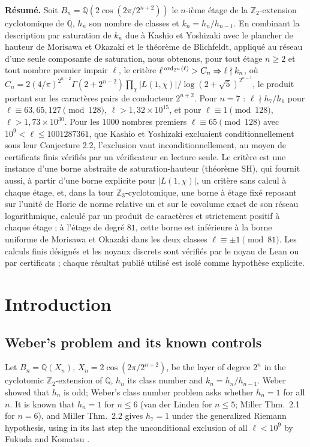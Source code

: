\documentclass[11pt]{amsart}
\theoremstyle{remark}\newtheorem{remark}[theorem]{Remark}
\theoremstyle{definition}\newtheorem{definition}[theorem]{Definition}
\newcommand{\Q}{\mathbb{Q}}\newcommand{\Z}{\mathbb{Z}}\newcommand{\R}{\mathbb{R}}\newcommand{\F}{\mathbb{F}}
\begin{document}
{\small\noindent\textbf{R\'esum\'e.} Soit $B_n=\Q(2\cos(2\pi/2^{n+2}))$ le $n$-i\`eme \'etage de la $\Z_2$-extension cyclotomique de $\Q$, $h_n$ son nombre de classes et $k_n=h_n/h_{n-1}$. En combinant la description par saturation de $k_n$ due \`a Kashio et Yoshizaki avec le plancher de hauteur de Morisawa et Okazaki et le th\'eor\`eme de Blichfeldt, appliqu\'e au r\'eseau d'une seule composante de saturation, nous obtenons, pour tout \'etage $n\ge2$ et tout nombre premier impair $\ell$, le crit\`ere $\ell^{\,\operatorname{ord}_{2^n}(\ell)}>C_n\Rightarrow\ell\nmid k_n$, o\`u $C_n=2(4/\pi)^{2^{n-2}}\Gamma(2+2^{n-2})\prod_{\chi}|L(1,\chi)|/\log(2+\sqrt5)^{2^{n-1}}$, le produit portant sur les caract\`eres pairs de conducteur $2^{n+2}$. Pour $n=7$ : $\ell\nmid h_7/h_6$ pour $\ell\equiv63,65,127\pmod{128}$, $\ell>1{,}32\times10^{15}$, et pour $\ell\equiv1\pmod{128}$, $\ell>1{,}73\times10^{30}$. Pour les $1000$ nombres premiers $\ell\equiv65\pmod{128}$ avec $10^9<\ell\le1001287361$, que Kashio et Yoshizaki excluaient conditionnellement sous leur Conjecture 2.2, l'exclusion vaut inconditionnellement, au moyen de certificats finis v\'erifi\'es par un v\'erificateur en lecture seule. Le crit\`ere est une instance d'une borne abstraite de saturation-hauteur (th\'eor\`eme SH), qui fournit aussi, \`a partir d'une borne explicite pour $|L(1,\chi)|$, un crit\`ere sans calcul \`a chaque \'etage, et, dans la tour $\Z_3$-cyclotomique, une borne \`a \'etage fix\'e reposant sur l'unit\'e de Horie de norme relative un et sur le covolume exact de son r\'eseau logarithmique, calcul\'e par un produit de caract\`eres et strictement positif \`a chaque \'etage ; \`a l'\'etage de degr\'e $81$, cette borne est inf\'erieure \`a la borne uniforme de Morisawa et Okazaki dans les deux classes $\ell\equiv\pm1\pmod{81}$. Les calculs finis d\'esign\'es et les noyaux discrets sont v\'erifi\'es par le noyau de Lean ou par certificats ; chaque r\'esultat publi\'e utilis\'e est isol\'e comme hypoth\`ese explicite.\par}\bigskip
\tableofcontents

\section{Introduction}
\subsection{Weber's problem and its known controls}
Let $B_n=\Q(X_n)$, $X_n=2\cos(2\pi/2^{n+2})$, be the layer of degree $2^n$ in the cyclotomic $\Z_2$-extension of $\Q$, $h_n$ its class number and $k_n=h_n/h_{n-1}$. Weber showed that $h_n$ is odd; Weber's class number problem asks whether $h_n=1$ for all $n$. It is known that $h_n=1$ for $n\le6$ (van der Linden for $n\le5$; Miller \cite{Mi} Thm.~2.1 for $n=6$), and Miller \cite{Mi} Thm.~2.2 gives $h_7=1$ under the generalized Riemann hypothesis, using in its last step the unconditional exclusion of all $\ell<10^9$ by Fukuda and Komatsu \cite{FK3}.
\end{document}
